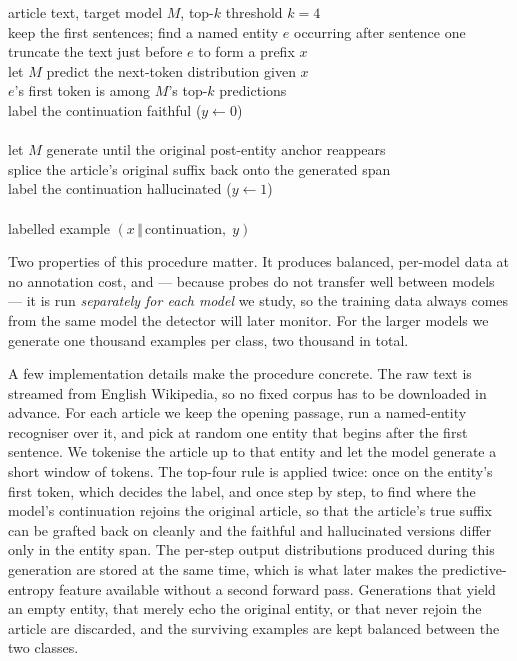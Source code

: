 \begin{algorithm}[h]
\caption{Automatic label generation for one article}
\label{alg:label}
\begin{algbody}
 article text, target model $M$, top-$k$ threshold $k=4$\\
keep the first sentences; find a named entity $e$ occurring after sentence one\\
truncate the text just before $e$ to form a prefix $x$\\
let $M$ predict the next-token distribution given $x$\\
 $e$'s first token is among $M$'s top-$k$ predictions \\
\alin label the continuation faithful ($y \gets 0$)\\
\\
\alin let $M$ generate until the original post-entity anchor reappears\\
\alin splice the article's original suffix back onto the generated span\\
\alin label the continuation hallucinated ($y \gets 1$)\\
\\
 labelled example $(x \,\Vert\, \text{continuation},\; y)$
\end{algbody}
\end{algorithm}

Two properties of this procedure matter. It produces balanced, per-model data at no
annotation cost, and --- because probes do not transfer well between models --- it is run
\emph{separately for each model} we study, so the training data always comes from the same
model the detector will later monitor. For the larger models we generate one thousand
examples per class, two thousand in total.

A few implementation details make the procedure concrete. The raw text is streamed from
English Wikipedia, so no fixed corpus has to be downloaded in advance. For each article we
keep the opening passage, run a named-entity recogniser over it, and pick at random one
entity that begins after the first sentence. We tokenise the article up to that entity and
let the model generate a short window of tokens. The top-four rule is applied twice: once on
the entity's first token, which decides the label, and once step by step, to find where the
model's continuation rejoins the original article, so that the article's true suffix can be
grafted back on cleanly and the faithful and hallucinated versions differ only in the entity
span. The per-step output distributions produced during this generation are stored at the
same time, which is what later makes the predictive-entropy feature available without a
second forward pass. Generations that yield an empty entity, that merely echo the original
entity, or that never rejoin the article are discarded, and the surviving examples are kept
balanced between the two classes.

